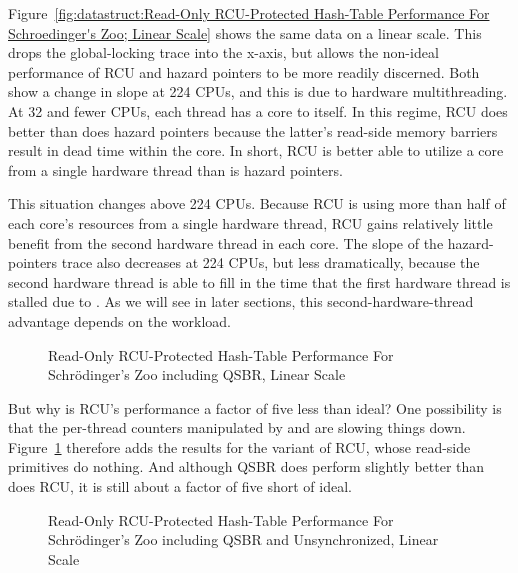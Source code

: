 Figure~\ref{fig:datastruct:Read-Only RCU-Protected Hash-Table Performance For Schroedinger's Zoo; Linear Scale}
shows the same data on a linear scale.
This drops the global-locking trace into the x-axis, but allows the
non-ideal performance of RCU and hazard pointers to be more readily
discerned.
Both show a change in slope at 224 CPUs, and this is due to hardware
multithreading.
At 32 and fewer CPUs, each thread has a core to itself.
In this regime, RCU does better than does hazard pointers because the
latter's read-side memory barriers result in dead time within the core.
In short, RCU is better able to utilize a core from a single hardware
thread than is hazard pointers.

This situation changes above 224 CPUs.
Because RCU is using more than half of each core's resources from a
single hardware thread, RCU gains relatively little benefit from the
second hardware thread in each core.
The slope of the hazard-pointers trace also decreases at 224 CPUs, but
less dramatically,
because the second hardware thread is able to fill in the time
that the first hardware thread is stalled due to .
As we will see in later sections, this second-hardware-thread
advantage depends on the workload.

\begin{figure}
\centering
{}
\caption{Read-Only RCU-Protected Hash-Table Performance For Schr\"odinger's Zoo including QSBR, Linear Scale}
\label{fig:datastruct:Read-Only RCU-Protected Hash-Table Performance For Schroedinger's Zoo including QSBR; Linear Scale}
\end{figure}

But why is RCU's performance a factor of five less than ideal?
One possibility is that the per-thread counters manipulated by
 and  are slowing things down.
Figure~\ref{fig:datastruct:Read-Only RCU-Protected Hash-Table Performance For Schroedinger's Zoo including QSBR; Linear Scale}
therefore adds the results for the  variant of RCU, whose read-side
primitives do nothing.
And although QSBR does perform slightly better than does RCU, it is still
about a factor of five short of ideal.

\begin{figure}
\centering
{}
\caption{Read-Only RCU-Protected Hash-Table Performance For Schr\"odinger's Zoo including QSBR and Unsynchronized, Linear Scale}
\label{fig:datastruct:Read-Only RCU-Protected Hash-Table Performance For Schroedinger's Zoo including QSBR and Unsynchronized; Linear Scale}
\end{figure}

